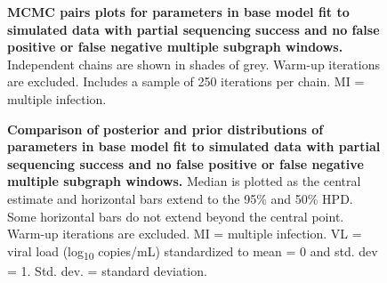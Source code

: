 \documentclass[10pt,letterpaper]{article}
\begin{document}
\begin{figure}[!ht]
\caption{{\bf MCMC pairs plots for parameters in base model fit to simulated data with partial sequencing success and no false positive or false negative multiple subgraph windows.} Independent chains are shown in shades of grey. Warm-up iterations are excluded. Includes a sample of 250 iterations per chain. MI = multiple infection.}
\end{figure}

\begin{figure}[!ht]
\caption{{\bf Comparison of posterior and prior distributions of parameters in base model fit to simulated data with partial sequencing success and no false positive or false negative multiple subgraph windows.} Median is plotted as the central estimate and horizontal bars extend to the 95\% and 50\% HPD. Some horizontal bars do not extend beyond the central point. Warm-up iterations are excluded. MI = multiple infection. VL = viral load (log\textsubscript{10} copies/mL) standardized to mean = 0 and std. dev = 1. Std. dev. = standard deviation. }
\end{figure}
\end{document}
